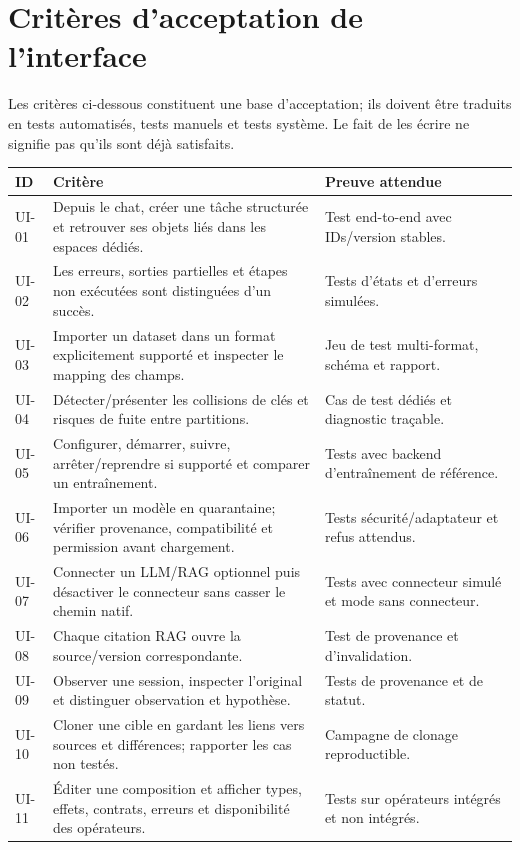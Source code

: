\documentclass[11pt,a4paper]{article}
\begin{document}
\section{Critères d'acceptation de l'interface}
Les critères ci-dessous constituent une base d'acceptation; ils doivent être traduits en tests automatisés, tests manuels et tests système. Le fait de les écrire ne signifie pas qu'ils sont déjà satisfaits.
\begin{longtable}{p{}p{}p{}}
\toprule
\textbf{ID} & \textbf{Critère} & \textbf{Preuve attendue}\\
\midrule
UI-01 & Depuis le chat, créer une tâche structurée et retrouver ses objets liés dans les espaces dédiés. & Test end-to-end avec IDs/version stables.\\
UI-02 & Les erreurs, sorties partielles et étapes non exécutées sont distinguées d'un succès. & Tests d'états et d'erreurs simulées.\\
UI-03 & Importer un dataset dans un format explicitement supporté et inspecter le mapping des champs. & Jeu de test multi-format, schéma et rapport.\\
UI-04 & Détecter/présenter les collisions de clés et risques de fuite entre partitions. & Cas de test dédiés et diagnostic traçable.\\
UI-05 & Configurer, démarrer, suivre, arrêter/reprendre si supporté et comparer un entraînement. & Tests avec backend d'entraînement de référence.\\
UI-06 & Importer un modèle en quarantaine; vérifier provenance, compatibilité et permission avant chargement. & Tests sécurité/adaptateur et refus attendus.\\
UI-07 & Connecter un LLM/RAG optionnel puis désactiver le connecteur sans casser le chemin natif. & Tests avec connecteur simulé et mode sans connecteur.\\
UI-08 & Chaque citation RAG ouvre la source/version correspondante. & Test de provenance et d'invalidation.\\
UI-09 & Observer une session, inspecter l'original et distinguer observation et hypothèse. & Tests de provenance et de statut.\\
UI-10 & Cloner une cible en gardant les liens vers sources et différences; rapporter les cas non testés. & Campagne de clonage reproductible.\\
UI-11 & Éditer une composition et afficher types, effets, contrats, erreurs et disponibilité des opérateurs. & Tests sur opérateurs intégrés et non intégrés.\\

\end{longtable}
\end{document}
